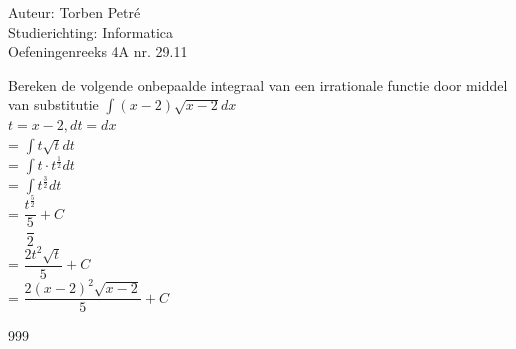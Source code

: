 \documentclass[a4paper]{article}
\begin{document}
  
\noindent \large Auteur: Torben Petré \\
\noindent \large Studierichting: Informatica\\
\noindent \large Oefeningenreeks 4A nr. 29.11\\

\medskip

\normalsize

Bereken de volgende onbepaalde integraal van een irrationale functie door middel van substitutie $\displaystyle\int (x - 2)\sqrt{x - 2} dx$\\

$t = x - 2, dt = dx$\\

= $\displaystyle\int t\sqrt{t} dt$\\

= $\displaystyle\int t \cdot t^{\tfrac{1}{2}} dt$\\

= $\displaystyle\int t^{\tfrac{3}{2}} dt$\\

= $\dfrac{t^{\tfrac{5}{2}}}{\dfrac{5}{2}} + C$\\

= $\dfrac{2t^2\sqrt{t}}{5} + C$\\

= $\dfrac{2(x - 2)^2\sqrt{x - 2}}{5} + C$\\

\begin{thebibliography}{999}
\end{thebibliography}
\end{document}
